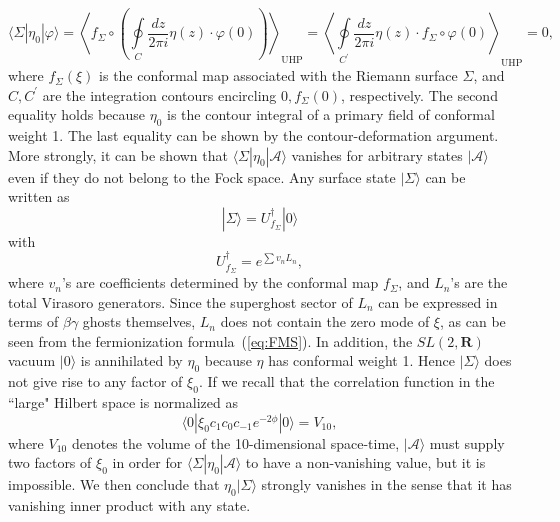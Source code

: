 \documentclass[a4paper,12pt]{article}
\newcommand{\cA}{\mathcal{A}}
\newcommand{\aaru}{\mathbf{R}}
\begin{document}
\begin{equation}
\langle\Sigma |\eta_0|\varphi\rangle=\left\langle f_{\Sigma}\circ\left(\oint\limits_C\frac{dz}{2\pi i}
\eta(z)\cdot\varphi(0)\right)\right\rangle_{\mathrm{UHP}}=\left\langle\oint\limits_{C^{\prime}}
\frac{dz}{2\pi i}\eta(z)\cdot f_{\Sigma}\circ\varphi(0)\right\rangle_{\mathrm{UHP}}=0, 
\label{eq:CG}
\end{equation}
where $f_{\Sigma}(\xi)$ is the conformal map associated with the Riemann surface $\Sigma$, 
and $C,C^{\prime}$ are the integration contours encircling $0,f_{\Sigma}(0)$, respectively. 
The second equality holds because $\eta_0$ is the contour integral of a primary field of 
conformal weight 1. The last equality can be shown by the contour-deformation argument. 
More strongly, it can be shown that $\langle\Sigma|\eta_0|\cA\rangle$ vanishes for 
arbitrary states $|\cA\rangle$ even if they do not belong to the Fock space. 
Any surface state $|\Sigma\rangle$ can be written as~\cite{LPP,RZ,Wedge} 
\begin{equation}
|\Sigma\rangle=U^{\dagger}_{f_{\Sigma}}|0\rangle \label{eq:XA}
\end{equation}
with
\begin{equation}
U^{\dagger}_{f_{\Sigma}}=e^{\sum v_n L_n}, \label{eq:XB}
\end{equation}
where $v_n$'s are coefficients determined by the conformal map $f_{\Sigma}$, and 
$L_n$'s are the total Virasoro generators. Since the superghost sector of $L_n$ 
can be expressed in terms of $\beta\gamma$ ghosts themselves, $L_n$ does not contain 
the zero mode of $\xi$, as can be seen from the fermionization formula~(\ref{eq:FMS}). 
In addition, the $SL(2,\aaru)$ vacuum $|0\rangle$ is annihilated by $\eta_0$ because $\eta$ 
has conformal weight 1. Hence $|\Sigma\rangle$ does not give rise to any factor of $\xi_0$. 
If we recall that the correlation function in the ``large" Hilbert space is normalized as 
\begin{equation}
\langle 0|\xi_0 c_1c_0c_{-1}e^{-2\phi}|0\rangle=V_{10}, 
\end{equation}
where $V_{10}$ denotes the volume of the 10-dimensional space-time, $|\cA\rangle$ must 
supply two factors of $\xi_0$ in order for $\langle\Sigma|\eta_0|\cA\rangle$ to have 
a non-vanishing value, but it is impossible. We then conclude that $\eta_0|\Sigma\rangle$ strongly 
vanishes in the sense that it has vanishing inner product with any state. 
\end{document}
